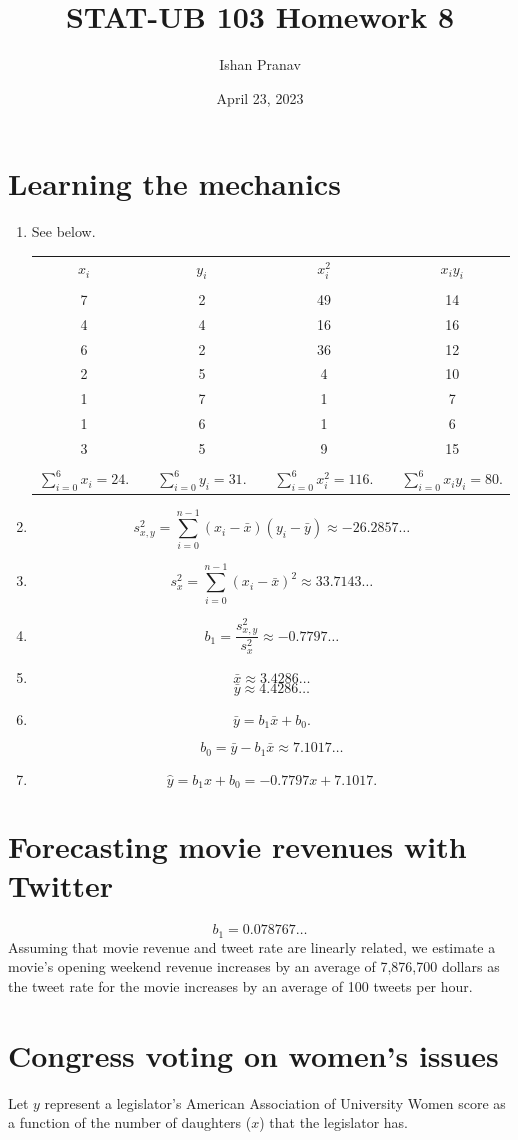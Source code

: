 \documentclass[12pt]{article}
\title{STAT-UB 103 Homework 8}
\author{Ishan Pranav}
\date{April 23, 2023}
\begin{document}
\maketitle
\section{Learning the mechanics}
\begin{enumerate}
\item See below.
\begin{center}
\begin{tabular}{ccccccc}
$x_i$&&$y_i$&&$x^2_i$&&$x_iy_i$\\\\
7&&2&&49&&14\\
4&&4&&16&&16\\
6&&2&&36&&12\\
2&&5&&4&&10\\
1&&7&&1&&7\\
1&&6&&1&&6\\
3&&5&&9&&15\\\\
$\sum_{i=0}^6{x_i}=24.$&&$\sum_{i=0}^6{y_i}=31.$&&$\sum_{i=0}^6{x^2_i}=116.$&&$\sum_{i=0}^6{x_iy_i}=80.$\\
\end{tabular}
\end{center}
\item\[s^2_{x,y}=\sum^{n-1}_{i=0}{(x_i-\bar{x})(y_i-\bar{y})}\approx -26.2857\dots\]
\item\[s^2_x=\sum^{n-1}_{i=0}{(x_i-\bar{x})^2}\approx 33.7143\dots\]
\item\[b_1=\frac{s^2_{x,y}}{s^2_x}\approx -0.7797\dots\]
\item\[\bar{x}\approx 3.4286\dots\]
\[\bar{y}\approx 4.4286\dots\]
\item\[\bar{y}=b_1\bar{x}+b_0.\]

\[b_0=\bar{y}-b_1\bar{x}\approx 7.1017\dots\]
\item\[\hat{y}=b_1x+b_0=-0.7797x+7.1017.\]
\end{enumerate}
\section{Forecasting movie revenues with Twitter}
\[b_1=0.078767\dots\]
Assuming that movie revenue and tweet rate are linearly related, we estimate a movie's opening weekend revenue increases by an average of 7,876,700 dollars as the tweet rate for the movie increases by an average of 100 tweets per hour.
\section{Congress voting on women's issues}
Let $y$ represent a legislator's American Association of University Women score as a function of the number of daughters ($x$) that the legislator has.
\end{document}
